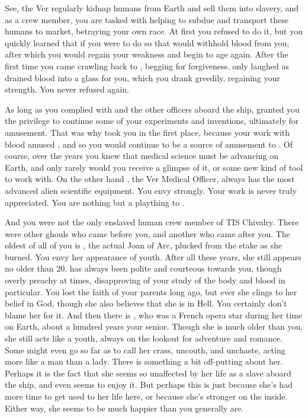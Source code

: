 \documentclass[char]{guildcamp4}
\begin{document}
See, the Ver regularly kidnap humans from Earth and sell them into slavery, and as a crew member, you are tasked with helping to subdue and transport these humans to market, betraying your own race. At first you refused to do it, but you quickly learned that if you were to do so that \cVone{} would withhold \cVone{\their} blood from you, after which you would regain your weakness and begin to age again. After the first time you came crawling back to \cVone{}, begging for forgiveness. \cVone{} only laughed as \cVone{\they} drained \cVone{\their} blood into a glass for you, which you drank greedily, regaining your strength. You never refused again.

As long as you complied with \cVone{} and the other officers aboard the ship, \cVone{} granted you the privilege to continue some of your experiments and inventions, ultimately for \cVone{\their} amusement. That was why \cVone{\they} took you in the first place, because your work with blood amused \cVone{\them}, and so you would continue to be a source of amusement to \cVone{\them}. Of course, over the years you knew that medical science must be advancing on Earth, and only rarely would you receive a glimpse of it, or some new kind of tool to work with. On the other hand \cVthree{}, the Ver Medical Officer, always has the most advanced alien scientific equipment. You envy \cVthree{\them} strongly. Your work is never truly appreciated. You are nothing but a plaything to \cVone{}.

And you were not the only enslaved human crew member of TIS Chivalry. There were other ghouls who came before you, and another who came after you. The oldest of all of you is \cJoan{}, the actual Joan of Arc, plucked from the stake as she burned. You envy her appearance of youth. After all these years, she still appears no older than 20. \cJoan{} has always been polite and courteous towards you, though overly preachy at times, disapproving of your study of the body and blood in particular. You lost the faith of your parents long ago, but ever she clings to her belief in God, though she also believes that she is in Hell. You certainly don't blame her for it. And then there is \cJulie{}, who was a French opera star during her time on Earth, about a hundred years your senior. Though she is much older than you, she still acts like a youth, always on the lookout for adventure and romance. Some might even go so far as to call her crass, uncouth, and unchaste, acting more like a man than a lady. There is something a bit off-putting about her. Perhaps it is the fact that she seems so unaffected by her life as a slave aboard the ship, and even seems to enjoy it. But perhaps this is just because she's had more time to get used to her life here, or because she's stronger on the inside. Either way, she seems to be much happier than you generally are.
\end{document}
